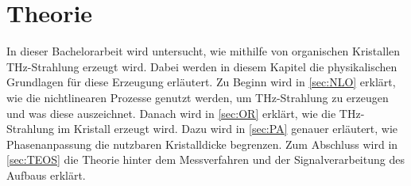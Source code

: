 \chapter{Theorie}
\label{sec:Theo}
In dieser Bachelorarbeit wird untersucht, wie mithilfe von organischen Kristallen THz-Strahlung erzeugt wird. 
Dabei werden in diesem Kapitel die physikalischen Grundlagen für diese Erzeugung erläutert.
Zu Beginn wird in \autoref{sec:NLO} 
erklärt, wie die nichtlinearen Prozesse genutzt werden, um THz-Strahlung zu erzeugen und was diese auszeichnet. 
Danach wird in \autoref{sec:OR} erklärt, wie die THz-Strahlung im Kristall erzeugt wird. 
Dazu wird in \autoref{sec:PA} genauer erläutert, wie Phasenanpassung
die nutzbaren Kristalldicke begrenzen.
Zum Abschluss wird in \autoref{sec:TEOS} die Theorie hinter dem Messverfahren und der Signalverarbeitung des Aufbaus erklärt.



